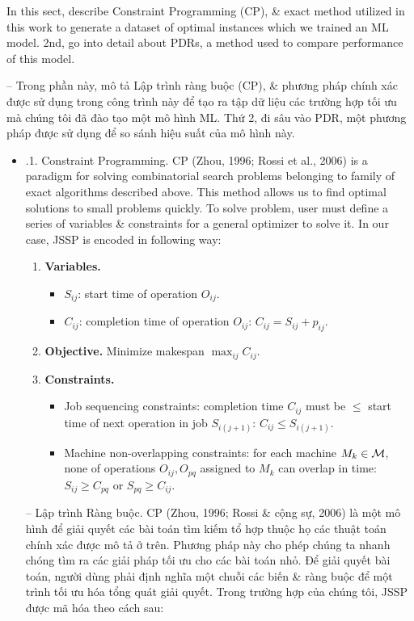 \documentclass{article}
\begin{document}
\begin{itemize}
\begin{itemize}
        In this sect, describe Constraint Programming (CP), \& exact method utilized in this work to generate a dataset of optimal instances which we trained an ML model. 2nd, go into detail about PDRs, a method used to compare performance of this model.

        -- Trong phần này, mô tả Lập trình ràng buộc (CP), \& phương pháp chính xác được sử dụng trong công trình này để tạo ra tập dữ liệu các trường hợp tối ưu mà chúng tôi đã đào tạo một mô hình ML. Thứ 2, đi sâu vào PDR, một phương pháp được sử dụng để so sánh hiệu suất của mô hình này.
        \begin{itemize}
            \item {.1. Constraint Programming.} CP (Zhou, 1996; Rossi et al., 2006) is a paradigm for solving combinatorial search problems belonging to family of exact algorithms described above. This method allows us to find optimal solutions to small problems quickly. To solve problem, user must define a series of variables \& constraints for a general optimizer to solve it. In our case, JSSP is encoded in following way:
            \begin{enumerate}
                \item {\bf Variables.}
                \begin{itemize}
                    \item $S_{ij}$: start time of operation $O_{ij}$.
                    \item $C_{ij}$: completion time of operation $O_{ij}$: $C_{ij} = S_{ij} + p_{ij}$.
                \end{itemize}
                \item {\bf Objective.} Minimize makespan $\max_{ij} C_{ij}$.
                \item {\bf Constraints.}
                \begin{itemize}
                    \item Job sequencing constraints: completion time $C_{ij}$ must be $\le$ start time of next operation in job $S_{i(j + 1)}$: $C_{ij}\le S_{i(j + 1)}$.
                    \item Machine non-overlapping constraints: for each machine $M_k\in{\cal M}$, none of operations $O_{ij},O_{pq}$ assigned to $M_k$ can overlap in time: $S_{ij}\ge C_{pq}$ or $S_{pq}\ge C_{ij}$.
                \end{itemize}
            \end{enumerate}
            -- {\sf Lập trình Ràng buộc.} CP (Zhou, 1996; Rossi \& cộng sự, 2006) là một mô hình để giải quyết các bài toán tìm kiếm tổ hợp thuộc họ các thuật toán chính xác được mô tả ở trên. Phương pháp này cho phép chúng ta nhanh chóng tìm ra các giải pháp tối ưu cho các bài toán nhỏ. Để giải quyết bài toán, người dùng phải định nghĩa một chuỗi các biến \& ràng buộc để một trình tối ưu hóa tổng quát giải quyết. Trong trường hợp của chúng tôi, JSSP được mã hóa theo cách sau:

\end{itemize}
\end{itemize}
\end{itemize}
\end{document}
